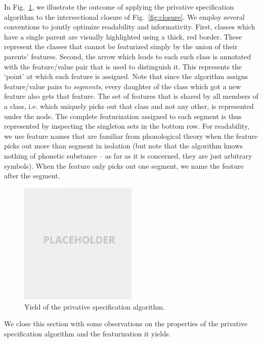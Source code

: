 \documentclass[11pt, oneside]{article}   	%
\begin{document}
\vspace{\baselineskip} In Fig.~\ref{fig:privative}, we illustrate the outcome of applying the privative specification algorithm to the intersectional closure of Fig.~\ref{fig:closure}. We employ several conventions to jointly optimize readability and informativity. First, classes which have a single parent are visually highlighted using a thick, red border. These represent the classes that cannot be featurized simply by the union of their parents' features. Second, the arrow which leads to each such class is annotated with the feature/value pair that is used to distinguish it. This represents the `point' at which each feature is assigned. Note that since the algorithm assigns feature/value pairs to \textit{segments}, every daughter of the class which got a new feature also gets that feature. The set of features that is shared by all members of a class, i.e. which uniquely picks out that class and not any other, is represented under the node. The complete featurization assigned to each segment is thus represented by inspecting the singleton sets in the bottom row. For readability, we use feature names that are familiar from phonological theory when the feature picks out more than segment in isolation (but note that the algorithm knows nothing of phonetic substance -- as far as it is concerned, they are just arbitrary symbols). When the feature only picks out one segment, we name the feature after the segment.

\begin{figure}[h]
  \centering
  \includegraphics[width=0.5\textwidth]{placeholder.png}
  \caption{Yield of the privative specification algorithm.}
  \label{fig:privative}
\end{figure}

We close this section with some observations on the properties of the privative specification algorithm and the featurization it yields. 
\end{document}
